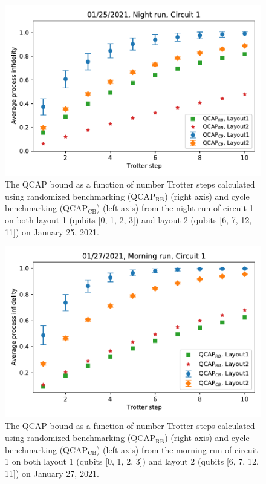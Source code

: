 \begin{figure}[H]
    \includegraphics[scale=0.56]{QCAP_CB_RB_Data_01_25_2021_Layout_1_2C1_Night.pdf}
    \caption{The QCAP bound as a function of number Trotter steps calculated using randomized benchmarking (QCAP$_{\text{RB}}$) (right axis) and cycle benchmarking (QCAP$_{\text{CB}}$) (left axis) from the night run of circuit 1 on both layout 1 (qubits [0, 1, 2, 3]) and layout 2 (qubits [6, 7, 12, 11]) on January 25, 2021.}
    \label{fig:QCAP_CB_RB_Data_01_25_2021_Layout_1_2C1_Night}
\end{figure}


\begin{figure}[H]
    \includegraphics[scale=0.56]{QCAP_CB_RB_Data_01_27_2021_Layout_1_2C1_Morning.pdf}
    \caption{The QCAP bound as a function of number Trotter steps calculated using randomized benchmarking (QCAP$_{\text{RB}}$) (right axis) and cycle benchmarking (QCAP$_{\text{CB}}$) (left axis) from the morning run of circuit 1 on both layout 1 (qubits [0, 1, 2, 3]) and layout 2 (qubits [6, 7, 12, 11]) on January 27, 2021.}
    \label{fig:QCAP_CB_RB_Data_01_27_2021_Layout_1_2C1_Morning}
\end{figure}
















